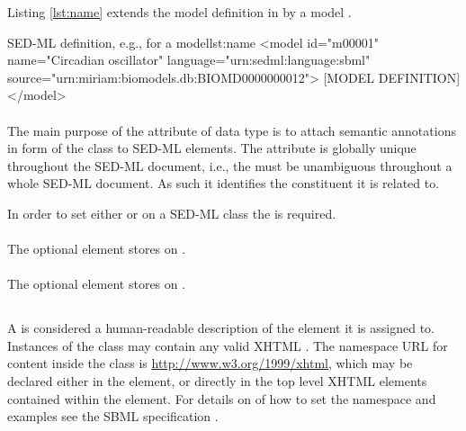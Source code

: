 \begin{blockChanged}
Listing \ref{lst:name} extends the model definition in  by a model .

\begin{myXmlLst}{SED-ML  definition, e.g., for a model}{lst:name}
<model id="m00001" name="Circadian oscillator" language="urn:sedml:language:sbml" source="urn:miriam:biomodels.db:BIOMD0000000012">
	[MODEL DEFINITION]
</model>
\end{myXmlLst}
\end{blockChanged}



\paragraph*{}
\label{sec:metaid}
The main purpose of the  attribute of data type  is to attach semantic annotations in form of the \Annotation class to SED-ML elements. The  attribute is globally unique throughout the SED-ML document, i.e., the  must be unambiguous throughout a whole SED-ML document. As such it identifies the constituent it is related to.

In order to set either \Notes or \Annotation on a SED-ML class the  is required.

\paragraph*{}
\label{sec:notesElement}
The optional  element stores \Notes on \SedBase.

\paragraph*{}
\label{sec:annotationElement}
The optional  element stores \Annotation on \SedBase.

\subsection{}
\label{class:notes}
A  is considered a human-readable description of the element it is assigned to. Instances of the  class may contain any valid XHTML \citep{P+02}. The namespace URL for  content inside the \Notes class is \url{http://www.w3.org/1999/xhtml}, which may be declared either in the \SedML element, or directly in the top level XHTML elements contained within the \hyperref[sec:notesElement]{} element. For details on of how to set the namespace and examples see the SBML specification \citep{HBH+10}.

